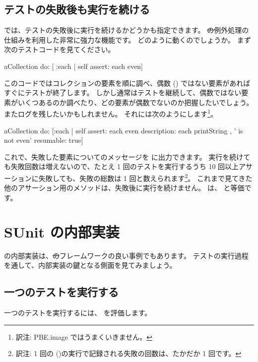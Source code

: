 \documentclass[a4paper,10pt,twoside]{book}
\begin{document}
\subsection{テストの失敗後も実行を続ける}
\sunit では、テストの失敗後に実行を続けるかどうかも指定できます。
\st の例外処理の仕組みを利用した非常に強力な機能です。
どのように動くのでしょうか。
まず次のテストコードを見てください。
\begin{code}{}
aCollection do: [ :each | self assert: each even]
\end{code}
このコードではコレクションの要素を順に調べ、偶数 () ではない要素があればすぐにテストが終了します。
しかし通常はテストを継続して、偶数ではない要素がいくつあるのか調べたり、どの要素が偶数でないのか把握したいでしょう。またログを残したいかもしれません。
それには次のようにします\footnote{訳注: PBE.image ではうまくいきません。}。
\begin{code}{}
aCollection do:
	[:each |
	self
		assert: each even
		description: each printString , ' is not even'
		resumable: true]
\end{code}
これで、失敗した要素についてのメッセージを  に出力できます。
実行を続けても失敗回数は増えないので、たとえ 1 回のテストを実行するうち 10 回以上アサーションに失敗しても、失敗の総数は 1 回と数えられます\footnote{訳注: 1 回の  ()の実行で記録される失敗の回数は、たかだか 1 回です。}。
これまで見てきた他のアサーション用のメソッドは、失敗後に実行を続けません。
 は、 と等価です。
\section{SUnit の内部実装}

\sunit の内部実装は、\st のフレームワークの良い事例でもあります。
テストの実行過程を通して、内部実装の鍵となる側面を見てみましょう。
\subsection{一つのテストを実行する}

一つのテストを実行するには、 を評価します。
\end{document}
